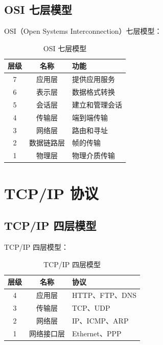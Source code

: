 \documentclass[12pt,UTF8]{ctexbook}
\begin{document}
\section{OSI 七层模型}
\label{sec:osi_model}

OSI（Open Systems Interconnection）七层模型：

\begin{table}[htbp]
    \centering
    \caption{OSI 七层模型}
    \begin{tabular}{|c|c|p{6cm}|}
        \hline
        \textbf{层级} & \textbf{名称} & \textbf{功能} \\
        \hline
        7 & 应用层 & 提供应用服务 \\
        \hline
        6 & 表示层 & 数据格式转换 \\
        \hline
        5 & 会话层 & 建立和管理会话 \\
        \hline
        4 & 传输层 & 端到端传输 \\
        \hline
        3 & 网络层 & 路由和寻址 \\
        \hline
        2 & 数据链路层 & 帧的传输 \\
        \hline
        1 & 物理层 & 物理介质传输 \\
        \hline
    \end{tabular}
\end{table}

\chapter{TCP/IP 协议}
\label{chap:tcp_ip}

\section{TCP/IP 四层模型}
\label{sec:tcp_ip_model}

TCP/IP 四层模型：
\begin{table}[htbp]
    \centering
    \caption{TCP/IP 四层模型}
    \begin{tabular}{|c|c|p{6cm}|}
        \hline
        \textbf{层级} & \textbf{名称} & \textbf{协议} \\
        \hline
        4 & 应用层 & HTTP、FTP、DNS \\
        \hline
        3 & 传输层 & TCP、UDP \\
        \hline
        2 & 网络层 & IP、ICMP、ARP \\
        \hline
        1 & 网络接口层 & Ethernet、PPP \\
        \hline
    \end{tabular}
\end{table}
\end{document}
